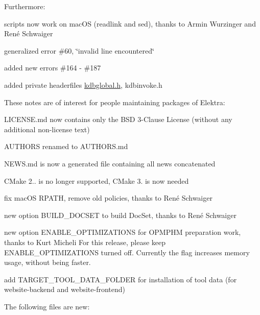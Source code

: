 Furthermore\+:


\begin{DoxyItemize}
\item scripts now work on mac\+OS (readlink and sed), thanks to Armin Wurzinger and René Schwaiger
\item generalized error \#60, \char`\"{}invalid line encountered\char`\"{}
\item added new errors \#164 -\/ \#187
\item added private headerfiles {\ttfamily \mbox{\hyperlink{kdbglobal_8h}{kdbglobal.\+h}}}, {\ttfamily kdbinvoke.\+h}
\end{DoxyItemize}

These notes are of interest for people maintaining packages of Elektra\+:


\begin{DoxyItemize}
\item L\+I\+C\+E\+N\+S\+E.\+md now contains only the B\+SD 3-\/Clause License (without any additional non-\/license text)
\item A\+U\+T\+H\+O\+RS renamed to A\+U\+T\+H\+O\+R\+S.\+md
\item N\+E\+W\+S.\+md is now a generated file containing all news concatenated
\item C\+Make 2.. is no longer supported, C\+Make 3. is now needed
\item fix mac\+OS {\ttfamily R\+P\+A\+TH}, remove old policies, thanks to René Schwaiger
\item new option {\ttfamily B\+U\+I\+L\+D\+\_\+\+D\+O\+C\+S\+ET} to build Doc\+Set, thanks to René Schwaiger
\item new option {\ttfamily E\+N\+A\+B\+L\+E\+\_\+\+O\+P\+T\+I\+M\+I\+Z\+A\+T\+I\+O\+NS} for {\ttfamily O\+P\+M\+P\+HM} preparation work, thanks to Kurt Micheli For this release, please keep {\ttfamily E\+N\+A\+B\+L\+E\+\_\+\+O\+P\+T\+I\+M\+I\+Z\+A\+T\+I\+O\+NS} turned off. Currently the flag increases memory usage, without being faster.
\item add {\ttfamily T\+A\+R\+G\+E\+T\+\_\+\+T\+O\+O\+L\+\_\+\+D\+A\+T\+A\+\_\+\+F\+O\+L\+D\+ER} for installation of tool data (for website-\/backend and website-\/frontend)
\end{DoxyItemize}

The following files are new\+:



